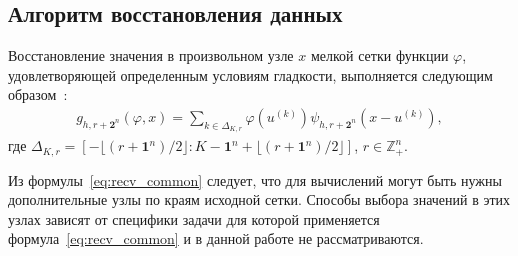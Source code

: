 
\label{sec:func_recv}

\subsection*{Алгоритм восстановления данных}

Восстановление значения в произвольном  узле $x$    мелкой сетки %
функции $\varphi$, удовлетворяющей определенным условиям гладкости, 
выполняется следующим образом~\cite{book_Zhuk}: 
\begin{gather}
  \label{eq:recv_common}
  g_{h,r+\mathbf{2}^n}(\varphi, x) = \sum_{k\in  \Delta_{K,r}}
   \varphi(u^{(k)})
   \psi_{h, r+\mathbf{2}^n}(x-u^{(k)}),%
 \end{gather}
 где $ \Delta_{K,r}=\left[-\lfloor{(r+\mathbf{1}^n)/2}\rfloor:
   K-\mathbf{1}^n+\lfloor{(r+\mathbf{1}^n)/2}\rfloor\right]$,
 $r\in\mathbb{Z}_+^n$.  

 
Из формулы~\eqref{eq:recv_common} следует, что для вычислений
могут быть нужны дополнительные
узлы по краям исходной сетки.
Способы выбора значений в этих узлах зависят
от специфики задачи для которой применяется формула~\eqref{eq:recv_common}  
и в данной работе не рассматриваются.








